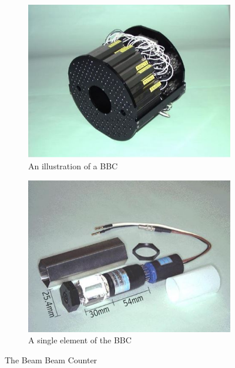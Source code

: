 \begin{figure}
\centering
\begin{subfigure}[b]{0.4\textwidth}
    \centering
    \includegraphics[width=\textwidth]{Figures/bbcrender.JPG}
    \caption{An illustration of a BBC}
    \label{fig:ppiratiocentvsperiph}
\end{subfigure}
\begin{subfigure}[b]{0.4\textwidth}
    \centering
    \includegraphics[width=\textwidth]{Figures/bbcsinglechannel.JPG}
    \caption{A single element of the BBC}
    \label{fig:Rcpcentvsperiph}
\end{subfigure}
\caption[The Beam Beam Counter]{The Beam Beam Counter}
\label{fig:baryonenhancementAA}
\end{figure}

